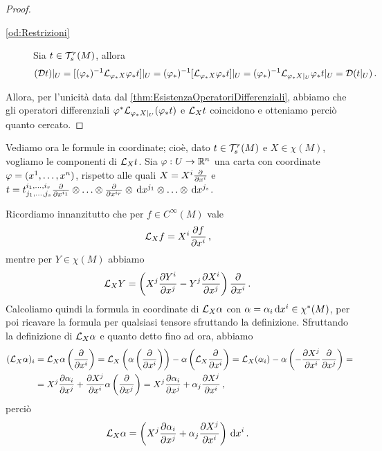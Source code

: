 \begin{proof}
\begin{description}
	\item [\ref{od:Restrizioni}]
		Sia $t\in\Tau_s^r(M)$, allora
		\begin{equation*}
			(\mathcal Dt)\restrict U = [(\varphi_*)^{-1} \Lie_{\varphi_*X}\varphi_*t]\restrict U 
			= (\varphi_*)^{-1}[\Lie_{\varphi_*X}\varphi_*t]\restrict U 
			= (\varphi_*)^{-1} \Lie_{\varphi_*X\restrict U}\varphi_*t \restrict U = \mathcal D(t\restrict U) \punto
		\end{equation*}
	\end{description}
	
	Allora, per l'unicità data dal \cref{thm:EsistenzaOperatoriDifferenziali}, abbiamo che gli operatori differenziali $\varphi^*\Lie_{\varphi_*X\restrict U}(\varphi_*t)$ e $\Lie_Xt$ coincidono e otteniamo perciò quanto cercato.
\end{proof}

Vediamo ora le formule in coordinate; cioè, dato $t\in\Tau_s^r(M)$ e $X\in\chi(M)$, vogliamo le componenti di $\Lie_Xt$.
Sia $\varphi: U \to \R^n$ una carta con coordinate $\varphi=(\seqa xn,)$, rispetto alle quali $X= X^i\DerParz{}{x^i}$ e $t = t^{\seqb ir,}_{\seqb js,} \DerParz{}{x^{i_1}} \otimes \ldots \otimes \DerParz{}{x^{i_r}} \otimes \de x^{j_1} \otimes \ldots \otimes \de x^{j_s}$.

Ricordiamo innanzitutto che per $f \in C^\infty(M)$ vale
\begin{equation*}
\Lie_X f = X^i \DerParz{f}{x^i} \virgola
\end{equation*}
mentre per $Y\in \chi(M)$ abbiamo
\begin{equation*}
\Lie_XY = \left( X^j\DerParz{Y^i}{x^j} - Y^j \DerParz{X^i}{x^j} \right) \DerParz{}{x^i}\punto
\end{equation*}
Calcoliamo quindi la formula in coordinate di $\Lie_X\alpha$ con $\alpha = \alpha_i \de x^i \in \chi^*(M)$, per poi ricavare la formula per qualsiasi tensore sfruttando la definizione. Sfruttando la definizione di $\Lie_X\alpha$ e quanto detto fino ad ora, abbiamo
\begin{align*}
	(\Lie_X\alpha)_i &= \Lie_X\alpha \left(\DerParz{}{x^i}\right) = \Lie_X \left(\alpha\left(\DerParz{}{x^i}\right)\right) - \alpha\left(\Lie_X\DerParz{}{x^i}\right) = \Lie_X(\alpha_i) - \alpha\left( - \DerParz{X^j}{x^i} \DerParz{}{x^j} \right) =  \\
	& = X^j \DerParz{\alpha_i}{x^j} + \DerParz{X^j}{x^i} \alpha\left( \DerParz{}{x^j} \right) = X^j \DerParz{\alpha_i}{x^j} + \alpha_j\DerParz{X^j}{x^i} \virgola
\end{align*}
perciò
\begin{equation*}
	\Lie_X\alpha = \left( X^j \DerParz{\alpha_i}{x^j} + \alpha_j\DerParz{X^j}{x^i} \right) \de x^i \punto
\end{equation*}

